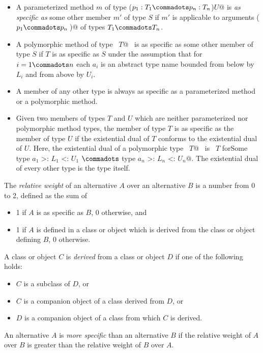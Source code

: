 \begin{itemize} 
\item
A parameterized method $m$ of type \lstinline@($p_1:T_1\commadots p_n:T_n$)$U$@ is {\em as specific as} some other
member $m'$ of type $S$ if $m'$ is applicable to arguments
\lstinline@($p_1 \commadots p_n\,$)@ of
types $T_1 \commadots T_n$.
\item
A polymorphic method of type
~\lstinline@[$a_1$ >: $L_1$ <: $U_1 \commadots a_n$ >: $L_n$ <: $U_n$]$T$@~ is
as specific as some other member of type $S$ if $T$ is as 
specific as $S$ under the assumption that for
$i = 1 \commadots n$ each $a_i$ is an abstract type name
bounded from below by $L_i$ and from above by $U_i$.
\item
A member of any other type is always as specific as a parameterized method
or a polymorphic method.
\item 
Given two members of types $T$ and $U$ which are 
neither parameterized nor polymorphic method types, the member of type $T$ is as specific as
the member of type $U$ if the existential dual of $T$ conforms to the existential dual of $U$. 
Here, the existential dual of a polymorphic type 
~\lstinline@[$a_1$ >: $L_1$ <: $U_1 \commadots a_n$ >: $L_n$ <: $U_n$]$T$@~ is
~\lstinline@$T$ forSome { type $a_1$ >: $L_1$ <: $U_1$ $\commadots$ type $a_n$ >: $L_n$ <: $U_n$}@.
The existential dual of every other type is the type itself.
\end{itemize}

The {\em relative weight} of an alternative $A$ over an alternative $B$ is a
number from 0 to 2, defined as the sum of
\begin{itemize}
\item 1 if $A$ is as specific as $B$, 0 otherwise, and
\item 1 if $A$ is defined in a class or object which is derived
      from the class or object defining $B$, 0 otherwise.
\end{itemize}
A class or object $C$ is {\em derived} from a class or object $D$ if one of
the following holds:
\begin{itemize}
\item $C$ is a subclass of $D$, or
\item $C$ is a companion object of a class derived from $D$, or
\item $D$ is a companion object of a class from which $C$ is derived.
\end{itemize}

An alternative $A$ is {\em more specific} than an alternative $B$ if
the relative weight of $A$ over $B$ is greater than the relative
weight of $B$ over $A$.

